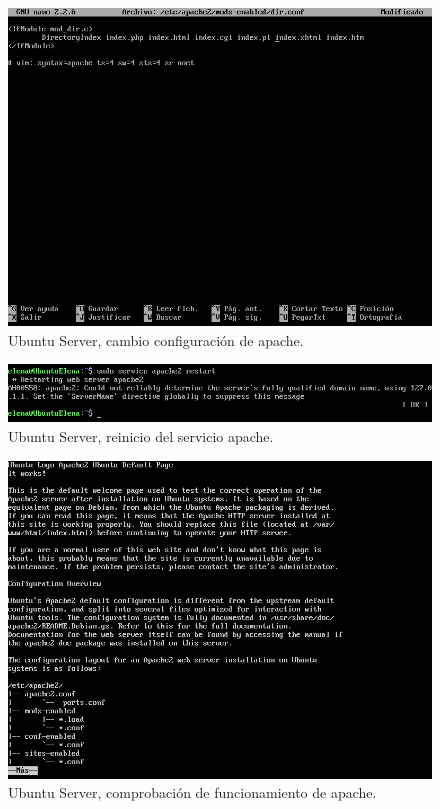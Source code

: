 \begin{figure}[H] 
	\centering
	\includegraphics[width=15cm]{./img/ejercicio9b.png} 	
	\caption{Ubuntu Server, cambio configuración de apache.} \label{fig:ejercicio9b}
\end{figure}


\begin{figure}[H] 
	\centering
	\includegraphics[width=15cm]{./img/ejercicio9c.png} 	
	\caption{Ubuntu Server, reinicio del servicio apache.} \label{fig:ejercicio9c}
\end{figure}


\begin{figure}[H] 
	\centering
	\includegraphics[width=15cm]{./img/ejercicio9h.png} 	
	\caption{Ubuntu Server, comprobación de funcionamiento de apache.} \label{fig:ejercicio9h}
\end{figure}


